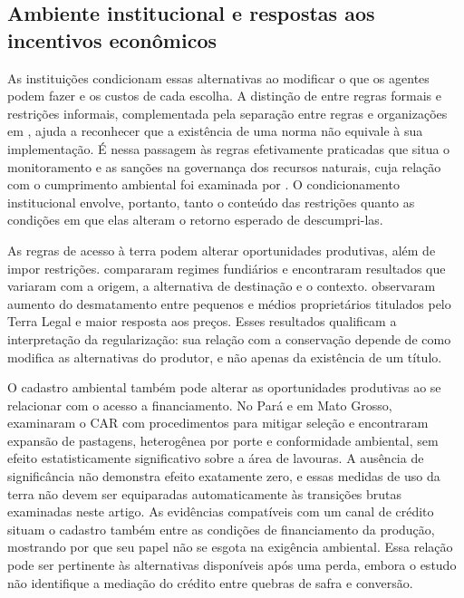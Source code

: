 \subsection{Ambiente institucional e respostas aos incentivos econômicos}
\label{literatura-instituicoes}

As instituições condicionam essas alternativas ao modificar o que os agentes podem fazer e os custos de cada escolha. A distinção de  entre regras formais e restrições informais, complementada pela separação entre regras e organizações em , ajuda a reconhecer que a existência de uma norma não equivale à sua implementação. É nessa passagem às regras efetivamente praticadas que  situa o monitoramento e as sanções na governança dos recursos naturais, cuja relação com o cumprimento ambiental foi examinada por . O condicionamento institucional envolve, portanto, tanto o conteúdo das restrições quanto as condições em que elas alteram o retorno esperado de descumpri-las.

As regras de acesso à terra podem alterar oportunidades produtivas, além de impor restrições.  compararam regimes fundiários e encontraram resultados que variaram com a origem, a alternativa de destinação e o contexto.  observaram aumento do desmatamento entre pequenos e médios proprietários titulados pelo Terra Legal e maior resposta aos preços. Esses resultados qualificam a interpretação da regularização: sua relação com a conservação depende de como modifica as alternativas do produtor, e não apenas da existência de um título.

O cadastro ambiental também pode alterar as oportunidades produtivas ao se relacionar com o acesso a financiamento. No Pará e em Mato Grosso,  examinaram o CAR com procedimentos para mitigar seleção e encontraram expansão de pastagens, heterogênea por porte e conformidade ambiental, sem efeito estatisticamente significativo sobre a área de lavouras. A ausência de significância não demonstra efeito exatamente zero, e essas medidas de uso da terra não devem ser equiparadas automaticamente às transições brutas examinadas neste artigo. As evidências compatíveis com um canal de crédito situam o cadastro também entre as condições de financiamento da produção, mostrando por que seu papel não se esgota na exigência ambiental. Essa relação pode ser pertinente às alternativas disponíveis após uma perda, embora o estudo não identifique a mediação do crédito entre quebras de safra e conversão.

